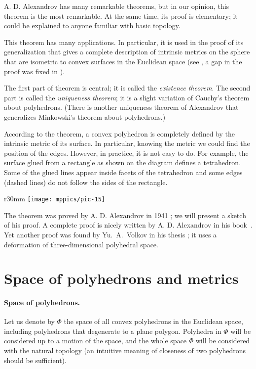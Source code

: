 A. D. Alexandrov has many remarkable theorems, but in our opinion, this theorem is the most remarkable.
At the same time, its proof is elementary;
it could be explained to anyone familiar with basic topology.

This theorem has many applications.
In particular, it is used in the proof of its generalization that gives a complete description of intrinsic metrics on the sphere that are isometric to convex surfaces in the Euclidean space
(see \cite{alexandrov-1948}, a gap in the proof was fixed in \cite{creutz-romney}).

The first part of theorem is central; it is called the \textit{existence theorem}.
The second part is called the \textit{uniqueness theorem}; it is a slight variation of Cauchy's theorem about polyhedrons.
(There is another uniqueness theorem of Alexandrov that generalizes Minkowski's theorem about  polyhedrons.)

According to the theorem, a convex polyhedron is completely defined by the intrinsic metric of its surface.
In particular, knowing the metric we could find the position of the edges.
However, in practice, it is not easy to do.
For example, the surface glued from a rectangle as shown on the diagram defines a tetrahedron.
Some of the glued lines appear inside facets of the tetrahedron and some edges (dashed lines) do not follow the sides of the rectangle.

{

\begin{wrapfigure}{r}{30mm}
\vskip-3mm
\centering
\texttt{[image: mppics/pic-15]}
\vskip-0mm
\end{wrapfigure}

The theorem was proved by A. D. Alexandrov in 1941 \cite{alexandrov-1941};
we will present a sketch of his proof.
A complete proof is nicely written by A. D. Alexandrov in his book~\cite{alexandrov}.
Yet another proof was found by Yu.~A.~Volkov in his thesis \cite{volkov};
it uses a deformation of three-dimensional polyhedral space.

}

\section{Space of polyhedrons and metrics}

\paragraph{Space of polyhedrons.}
Let us denote by $\Phi$ the space of all convex polyhedrons in the Euclidean space,
including polyhedrons that degenerate to a plane polygon.
Polyhedra in $\Phi$ will be considered up to a motion of the space, 
and the whole space $\Phi$ will be considered with the natural topology (an intuitive meaning of closeness of two polyhedrons should be sufficient).  

